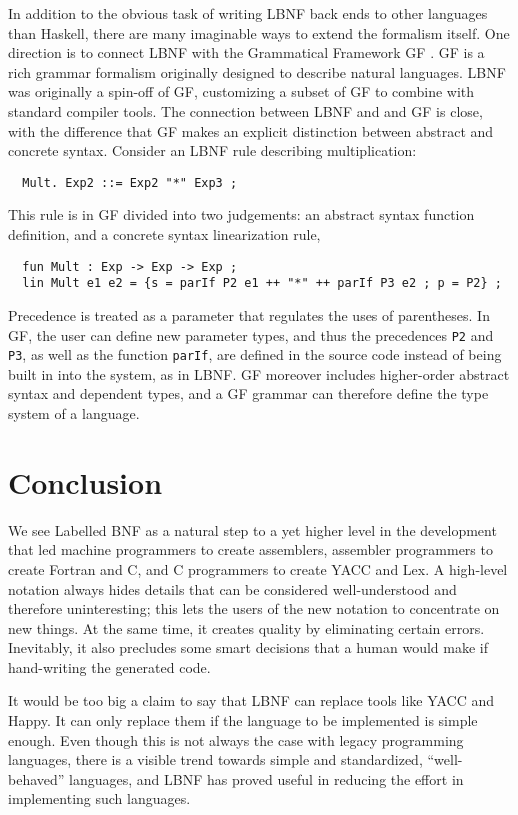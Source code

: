 \documentclass[10pt]{article}
\begin{document}
In addition to the obvious task of writing LBNF back ends to other
languages than Haskell, there are many imaginable ways to extend
the formalism itself. One direction is to connect LBNF with the Grammatical
Framework GF \cite{GF-paper}. GF is a rich grammar formalism originally designed
to describe natural languages. LBNF was originally a spin-off of GF, 
customizing a subset of GF to combine with standard compiler tools.
The connection between LBNF and and GF is close, with the difference 
that GF makes an explicit distinction between abstract and concrete syntax.
Consider an LBNF rule describing multiplication:
\begin{verbatim}
  Mult. Exp2 ::= Exp2 "*" Exp3 ;
\end{verbatim}
This rule is in GF divided into two judgements: an abstract syntax function
definition, and a concrete syntax linearization rule,
\begin{verbatim}
  fun Mult : Exp -> Exp -> Exp ;
  lin Mult e1 e2 = {s = parIf P2 e1 ++ "*" ++ parIf P3 e2 ; p = P2} ;
\end{verbatim}
Precedence is treated as a parameter that regulates the uses
of parentheses. In GF, the user can define new parameter types, and thus
the precedences {\tt P2} and {\tt P3}, as well as the function {\tt parIf},
are defined in the source code instead of being built in into the system, 
as in LBNF.
GF moreover includes higher-order abstract syntax and
dependent types, and a GF grammar can therefore define the type system of
a language. 


\section{Conclusion}

We see Labelled BNF as a natural step
to a yet higher level in the development that led
machine programmers to create assemblers,
assembler programmers to create Fortran and C,
and C programmers to create YACC and Lex.
A high-level notation always hides 
details that can be considered well-understood and
therefore uninteresting; this lets the users of
the new notation to concentrate on new things.
At the same time, it creates quality by eliminating
certain errors. Inevitably, it also precludes
some smart decisions that a human would make
if hand-writing the generated code.

It would be too big a claim to say that LBNF can
replace tools like YACC and Happy. It can only replace them if
the language to be implemented is simple enough. Even though
this is not always the case with legacy programming languages,
there is a visible trend towards simple and standardized,
``well-behaved'' languages,
and LBNF has proved useful in reducing the effort in
implementing such languages.
\end{document}

